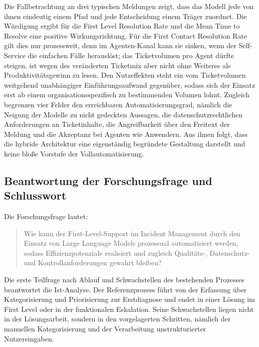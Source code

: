 Die Fallbetrachtung an drei typischen Meldungen zeigt, dass das Modell jede von ihnen eindeutig einem Pfad und jede Entscheidung einem Tr\"ager zuordnet. Die W\"urdigung ergibt f\"ur die First Level Resolution Rate und die Mean Time to Resolve eine positive Wirkungsrichtung. F\"ur die First Contact Resolution Rate gilt dies nur prozessweit, denn im Agenten-Kanal kann sie sinken, wenn der Self-Service die einfachen F\"alle herausl\"ost; das Ticketvolumen pro Agent d\"urfte steigen, ist wegen des ver\"anderten Ticketmix aber nicht ohne Weiteres als Produktivit\"atsgewinn zu lesen. Den Nutzeffekten steht ein vom Ticketvolumen weitgehend unabh\"angiger Einf\"uhrungsaufwand gegen\"uber, sodass sich der Einsatz erst ab einem organisationsspezifisch zu bestimmenden Volumen lohnt. Zugleich begrenzen vier Felder den erreichbaren Automatisierungsgrad, n\"amlich die Neigung der Modelle zu nicht gedeckten Aussagen, die datenschutzrechtlichen Anforderungen an Ticketinhalte, die Angreifbarkeit \"uber den Freitext der Meldung und die Akzeptanz bei Agenten wie Anwendern. Aus ihnen folgt, dass die hybride Architektur eine eigenst\"andig begr\"undete Gestaltung darstellt und keine blo{\ss}e Vorstufe der Vollautomatisierung.

\subsection{Beantwortung der Forschungsfrage und Schlusswort}
\label{beantwortung}

Die Forschungsfrage lautet:

\begin{quote}
\glqq Wie kann der First-Level-Support im Incident Management durch den Einsatz von Large Language Models prozessual automatisiert werden, sodass Effizienzpotenziale realisiert und zugleich Qualit\"ats-, Datenschutz- und Kontrollanforderungen gewahrt bleiben?\grqq{}
\end{quote}

Die erste Teilfrage nach Ablauf und Schwachstellen des bestehenden Prozesses beantwortet die Ist-Analyse. Der Referenzprozess f\"uhrt von der Erfassung \"uber Kategorisierung und Priorisierung zur Erstdiagnose und endet in einer L\"osung im First Level oder in der funktionalen Eskalation. Seine Schwachstellen liegen nicht in der L\"osungsarbeit, sondern in den vorgelagerten Schritten, n\"amlich der manuellen Kategorisierung und der Verarbeitung unstrukturierter Nutzereingaben.

